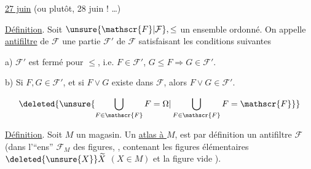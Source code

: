 \uline{27 juin} (ou plutôt, 28 juin ! \ldots)

\uline{Définition}. Soit $\unsure{\mathscr{F}|\mathcal{F}},\leq$ un ensemble ordonné. On appelle \uline{antifiltre} de $\mathscr{F}$ une partie $\mathscr{F}'$ de $\mathscr{F}$ satisfaisant les conditions suivantes

a) $\mathscr{F}'$ est fermé pour $\leq$, i.e. $F\in\mathscr{F}'$, $G\leq F\Rightarrow G\in\mathscr{F}'$.

b) Si $F,G\in\mathscr{F}'$, et si $F\vee G$ existe dans $\mathscr{F}$, alors $F\vee G\in\mathscr{F}'$.

\[
\deleted{\unsure{\bigcup_{F\in\mathscr{F}}F=\Omega|\bigcup_{F\in\mathscr{F}}F=\mathscr{F}}}
\]

\uline{Définition}. Soit $M$ un magasin. Un \uline{atlas  à $M$},  est par définition un antifiltre $\mathscr{F}$ (dans l'``ens'' $\mathscr{F}_M$ des figures, ,  contenant les  figures élémentaires $\deleted{\unsure{X}}\widetilde{X}$ $(X\in M)$ et la figure vide ).


